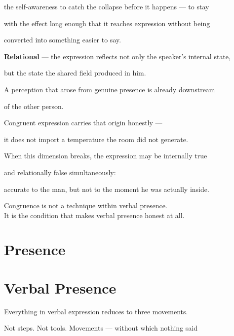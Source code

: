 \documentclass[12pt, a4paper]{article}
\begin{document}
the self-awareness to catch the collapse before it happens --- to stay

with the effect long enough that it reaches expression without being

converted into something easier to say.

\textbf{Relational} --- the expression reflects not only the speaker's internal state,

but the state the shared field produced in him.

A perception that arose from genuine presence is already downstream

of the other person.

Congruent expression carries that origin honestly ---

it does not import a temperature the room did not generate.

When this dimension breaks, the expression may be internally true

and relationally false simultaneously:

accurate to the man, but not to the moment he was actually inside.


\medskip

\noindent Congruence is not a technique within verbal presence.\\

It is the condition that makes verbal presence honest at all.


\section{Presence}\label{sec:presence}





\section{Verbal Presence}\label{sec:verbal_presence}

Everything in verbal expression reduces to three movements.

Not steps. Not tools. Movements --- without which nothing said
\end{document}
